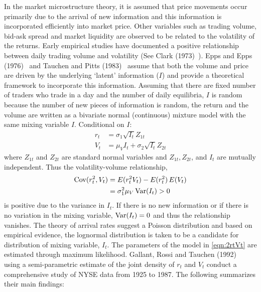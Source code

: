 In the market microstructure theory, it is assumed that price movements occur primarily due to the arrival of new information and this information is incorporated efficiently into market price. Other variables such as trading volume, bid-ask spread and market liquidity are observed to be related to the volatility of the returns. Early empirical studies have documented a positive relationship between daily trading volume and volatility (See Clark (1973)~\cite{clark}). Epps and Epps (1976)~\cite{epps} and Tauchen and Pitts (1983)~\cite{tauchenpitts} assume that both the volume and price are driven by the underlying `latent' information ($I$) and provide a theoretical framework to incorporate this information. Assuming that there are fixed number of traders who trade in a day and the number of daily equilibria, $I$ is random because the number of new pieces of information is random, the return and the volume are written as a bivariate normal (continuous) mixture model with the same mixing variable $I$. Conditional on $I$:
	\begin{equation} \label{eqn:2rtVt}
	\begin{split}
	 r_t&= \sigma_1 \sqrt{I_t}Z_{1t} \\
	 V_t&= \mu_VI_t + \sigma_2 \sqrt{I_t}Z_{2t}
	 \end{split}
	 \end{equation}
where $Z_{1t}$ and $Z_{2t}$ are standard normal variables and $Z_{1t},  Z_{2t}$, and $I_t$ are mutually independent. Thus the volatility-volume relationship,
	\begin{equation} \label{eqn:2covVt}
	\begin{split}
	\cov(r_t^2,V_t)& = E(r_{t}^2V_t) - E(r_t^2) \,E(V_t) \\ 
	&= \sigma_1^2 \mu_V \var(I_t) > 0
	\end{split}
	\end{equation}
is positive due to the variance in $I_t$. If there is no new information or if there is no variation in the mixing variable, $\operatorname{Var}(I_t)= 0$ and thus the relationship vanishes. The theory of arrival rates suggest a
Poisson distribution and based on empirical evidence, the lognormal distribution is taken to be a candidate for distribution of mixing variable, $I_t$. The parameters of the model in \eqref{eqn:2rtVt} are estimated through maximum likelihood. Gallant, Rossi and Tauchen (1992)~\cite{grt} using a semi-parametric estimate of the joint density of $r_t$ and $V_t$ conduct a comprehensive study of NYSE data from 1925 to 1987. The following summarizes their main findings: \twomedskip


